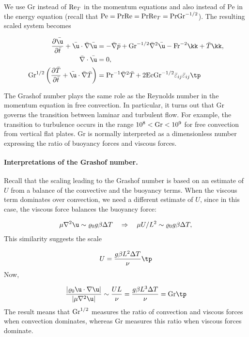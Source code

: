 \documentclass[graybox,envcountchap,sectrefs,final]{svmonodo}
\begin{document}
We use Gr instead of $\hbox{Re}_T$ in the momentum equations and also
instead of Pe in the energy equation (recall that $\hbox{Pe} =
\hbox{Pr}\hbox{Re} =
\hbox{Pr}\hbox{Re}_T=\hbox{Pr}\hbox{Gr}^{-1/2}$). The resulting scaled
system becomes

\begin{align}
\frac{\partial \bar\u}{\partial \bar t} +
\bar \u\cdot\bar \nabla\bar\u
&= -\bar\nabla \bar p + \hbox{Gr}^{-1/2}\bar \nabla^2\bar \u
- \hbox{Fr}^{-2}\kk  + \bar T \kk,
\label{scale:fluid:free_convection:eq:momentum_TB1}\\ 
\bar\nabla\cdot\bar\u & = 0,
\label{scale:fluid:free_convection:eq:cont_TB1}\\ 
\hbox{Gr}^{1/2}\left(\frac{\partial \bar T}{\partial \bar t} +
\bar\u\cdot\bar\nabla \bar T\right)
&= \hbox{Pr}^{-1}
\bar \nabla^2 \bar T + 2\hbox{Ec}\hbox{Gr}^{-1/2}
\bar\varepsilon_{ij}\bar\varepsilon_{ij}\tp
\label{scale:fluid:free_convection:eq:energy_TB1}
\end{align}

The Grashof number plays the same
role as the Reynolds number in the momentum equation in free
convection. In particular,
it turns out that Gr governs the transition between laminar and
turbulent flow.  For example, the transition to turbulence occurs in
the range $10^8 < \hbox{Gr} < 10^9$ for free convection from vertical
flat plates.  Gr is normally interpreted as a dimensionless number
expressing the ratio of buoyancy forces and viscous forces.

\paragraph{Interpretations of the Grashof number.}
Recall that the scaling leading to the Grashof number is based on an
estimate of $U$ from a balance of the convective and the buoyancy
terms. When the viscous term dominates over convection, we need a
different estimate of $U$, since in this case, the viscous force
balances the buoyancy force:

\[ \mu\nabla^2\u \sim \varrho_0g\beta\Delta T\quad
\Rightarrow\quad \mu U/L^2 \sim \varrho_0g\beta\Delta T,\]
This similarity suggests the scale

\[ U = \frac{g\beta L^2 \Delta T}{\nu}\tp\]
Now,

\[ \frac{|\varrho_0\u\cdot\nabla\u|}{|\mu\nabla^2\u|} \sim \frac{UL}{\nu}
= \frac{g\beta L^3 \Delta T}{\nu} = \hbox{Gr}\tp\]
The result means that $\hbox{Gr}^{1/2}$ measures the ratio of convection and
viscous forces when convection dominates, whereas Gr measures this ratio when
viscous forces dominate.
\end{document}
